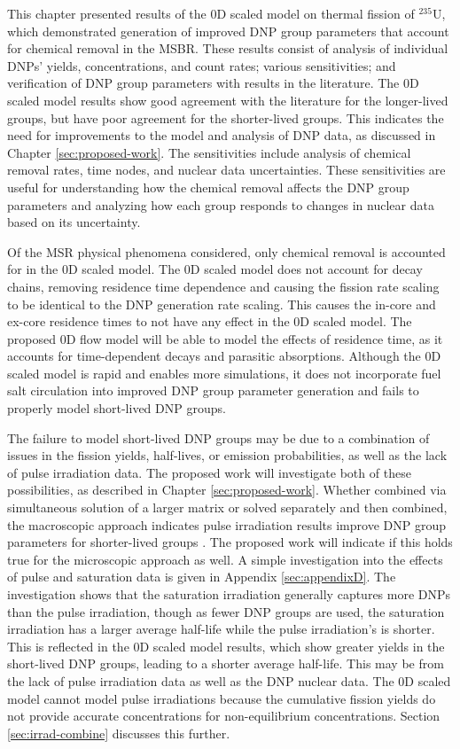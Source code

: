 This chapter presented results of the 0D scaled model on thermal fission of $^{235}$U, which demonstrated generation of improved \gls{DNP} group parameters that account for chemical removal in the \gls{MSBR}.
These results consist of analysis of individual \glspl{DNP}' yields, concentrations, and count rates; various sensitivities; and verification of \gls{DNP} group parameters with results in the literature.
The 0D scaled model results show good agreement with the literature for the longer-lived groups, but have poor agreement for the shorter-lived groups.
This indicates the need for improvements to the model and analysis of \gls{DNP} data, as discussed in Chapter \ref{sec:proposed-work}.
The sensitivities include analysis of chemical removal rates, time nodes, and nuclear data uncertainties.
These sensitivities are useful for understanding how the chemical removal affects the \gls{DNP} group parameters and analyzing how each group responds to changes in nuclear data based on its uncertainty.

Of the \gls{MSR} physical phenomena considered, only chemical removal is accounted for in the 0D scaled model.
The 0D scaled model does not account for decay chains, removing residence time dependence and causing the fission rate scaling to be identical to the \gls{DNP} generation rate scaling.
This causes the in-core and ex-core residence times to not have any effect in the 0D scaled model.
The proposed 0D flow model will be able to model the effects of residence time, as it accounts for time-dependent decays and parasitic absorptions.
Although the 0D scaled model is rapid and enables more simulations, it does not incorporate fuel salt circulation into improved \gls{DNP} group parameter generation and fails to properly model short-lived \gls{DNP} groups.

The failure to model short-lived \gls{DNP} groups may be due to a combination of issues in the fission yields, half-lives, or emission probabilities, as well as the lack of pulse irradiation data.
The proposed work will investigate both of these possibilities, as described in Chapter \ref{sec:proposed-work}.
Whether combined via simultaneous solution of a larger matrix or solved separately and then combined, the macroscopic approach indicates pulse irradiation results improve \gls{DNP} group parameters for shorter-lived groups \cite{keepin1957delayed}.
The proposed work will indicate if this holds true for the microscopic approach as well.
A simple investigation into the effects of pulse and saturation data is given in Appendix \ref{sec:appendixD}. 
The investigation shows that the saturation irradiation generally captures more \glspl{DNP} than the pulse irradiation, though as fewer \gls{DNP} groups are used, the saturation irradiation has a larger average half-life while the pulse irradiation's is shorter.
This is reflected in the 0D scaled model results, which show greater yields in the short-lived \gls{DNP} groups, leading to a shorter average half-life.
This may be from the lack of pulse irradiation data as well as the \gls{DNP} nuclear data.
The 0D scaled model cannot model pulse irradiations because the cumulative fission yields do not provide accurate concentrations for non-equilibrium concentrations.
Section \ref{sec:irrad-combine} discusses this further.

